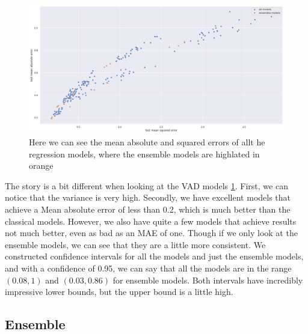     \begin{figure}[htp]
        \centering
        \includegraphics[width=14cm]{figures/results/nn_err}   
        \caption{Here we can see the mean absolute and squared errors of allt he regression models, where the ensemble models are highlated in orange}
        \label{fig:nn_err} 
    \end{figure}


    The story is a bit different when looking at the VAD models \ref{fig:nn_err}. First, we can notice that the variance is very high. 
    Secondly, we have excellent models that achieve a Mean absolute error of less than 0.2, which is much better than the classical models. However, 
    we also have quite a few models that achieve results not much better, even as bad as an MAE of one. Though if we only look at the ensemble models, 
    we can see that they are a little more consistent. We constructed confidence intervals for all the models and just the ensemble models, 
    and with a confidence of 0.95, we can say that all the models are in the range $(0.08, 1)$ and $(0.03, 0.86)$ for ensemble models. Both intervals 
    have incredibly impressive lower bounds, but the upper bound is a little high. 

    \subsection{Ensemble}
